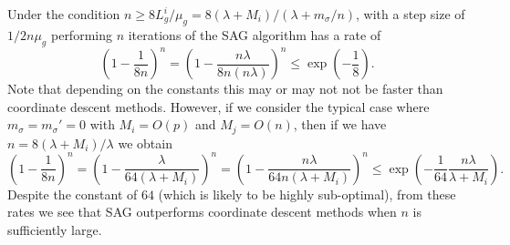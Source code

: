 \documentclass{article}
\begin{document}
Under the condition $n \geqslant 8L_g^i/\mu_g = 8(\lambda + M_i)/(\lambda + m_\sigma/n)$, with a step size of $1/2n\mu_g$ performing $n$ iterations of the SAG algorithm has a rate of
\[
\left(1 - \frac{1}{8n}\right)^n
= \left(1 - \frac{n\lambda}{8n(n\lambda)}\right)^n
\leq \exp\left(-\frac{1}{8}\right).
\]
Note that depending on the constants this may or may not not be faster than coordinate descent methods.  However, if we consider the typical case where $m_\sigma = m_\sigma' = 0$ with $M_i = O(p)$ and $M_j = O(n)$, then if we have $n = 8(\lambda + M_i)/\lambda$ we obtain
\[
\left(1 - \frac{1}{8n}\right)^n
= \left(1 - \frac{\lambda}{64(\lambda + M_i)}\right)^n
= \left(1 - \frac{n\lambda}{64n(\lambda + M_i)}\right)^n
\leq \exp\left(-\frac{1}{64}\frac{n\lambda}{\lambda + M_i}\right).
\]
Despite the constant of $64$ (which is likely to be highly sub-optimal), from these rates we see that SAG outperforms coordinate descent methods when $n$ is sufficiently large.





\setlength{\parsep}{0pt}
\setlength{\parskip}{0pt}

\end{document}
